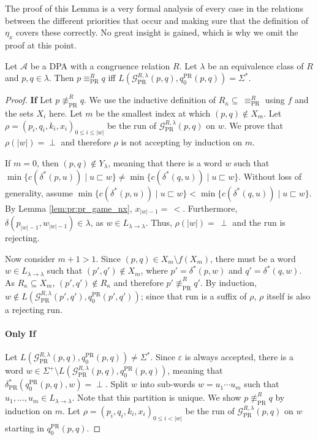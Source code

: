 	The proof of this Lemma is a very formal analysis of every case in the relations between the different priorities that occur and making sure that the definition of $\eta_x$ covers these correctly. No great insight is gained, which is why we omit the proof at this point.

\begin{theorem}
	Let $\mathcal{A}$ be a DPA with a congruence relation $R$. Let $\lambda$ be an equivalence class of $R$ and $p, q \in \lambda$. Then $p \equiv_\text{PR}^R q$ iff $L(\mathcal{G}_\text{PR}^{R,\lambda}(p, q), q_0^\text{PR}(p, q)) = \Sigma^*$.
\end{theorem}

\begin{proof}
	\textbf{If } Let $p \not\equiv_\text{PR}^R q$. We use the inductive definition of $R_\kappa \subseteq\, \equiv_\text{PR}^R$ using $f$ and the sets $X_i$ here. Let $m$ be the smallest index at which $(p, q) \notin X_m$. Let $\rho = (p_i, q_i, k_i, x_i)_{0 \leq i \leq |w|}$ be the run of $\mathcal{G}_\text{PR}^{R,\lambda}(p, q)$ on $w$. We prove that $\rho(|w|) = \perp$ and therefore $\rho$ is not accepting by induction on $m$.
	
	If $m = 0$, then $(p, q) \notin Y_\lambda$, meaning that there is a word $w$ such that $\min \{ c(\delta^*(p, u)) \mid u \sqsubset w \} \neq \min \{ c(\delta^*(q, u)) \mid u \sqsubset w \}$. Without loss of generality, assume $\min \{ c(\delta^*(p, u)) \mid u \sqsubset w \} < \min \{ c(\delta^*(q, u)) \mid u \sqsubset w \}$. By Lemma \ref{lem:pr:pr_game_nx}, $x_{|w|-1} =\, <$. Furthermore, $\delta(p_{|w|-1}, w_{|w|-1}) \in \lambda$, as $w \in L_{\lambda \rightarrow \lambda}$. Thus, $\rho(|w|) =\, \perp$ and the run is rejecting.
	
	Now consider $m+1 > 1$. Since $(p, q) \in X_m \setminus f(X_m)$, there must be a word $w \in L_{\lambda \rightarrow \lambda}$ such that $(p', q') \notin X_m$, where $p' = \delta^*(p, w)$ and $q' = \delta^*(q, w)$. As $R_\kappa \subseteq X_m$, $(p', q') \notin R_\kappa$ and therefore $p' \not\equiv_\text{PR}^R q'$. By induction, $w \notin L(\mathcal{G}_\text{PR}^{R,\lambda}(p', q'), q_0^\text{PR}(p', q'))$; since that run is a suffix of $\rho$, $\rho$ itself is also a rejecting run.
	
	\paragraph{Only If} Let $L(\mathcal{G}_\text{PR}^{R,\lambda}(p, q), q_0^\text{PR}(p, q)) \neq \Sigma^*$. Since $\varepsilon$ is always accepted, there is a word $w \in \Sigma^+ \setminus L(\mathcal{G}_\text{PR}^{R,\lambda}(p, q), q_0^\text{PR}(p, q))$, meaning that $\delta_\text{PR}^*(q_0^\text{PR}(p, q), w) = \perp$. Split $w$ into sub-words $w = u_1 \cdots u_m$ such that $u_1, \dots, u_m \in L_{\lambda \rightarrow \lambda}$. Note that this partition is unique. We show $p \not\equiv_\text{PR}^R q$ by induction on $m$. Let $\rho = (p_i, q_i, k_i, x_i)_{0 \leq i < |w|}$ be the run of $\mathcal{G}_\text{PR}^{R,\lambda}(p, q)$ on $w$ starting in $q_0^\text{PR}(p, q)$.
	

\end{proof}
